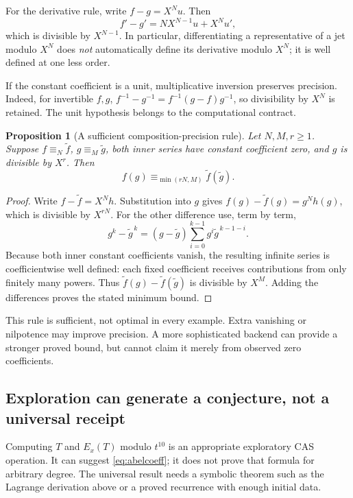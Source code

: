 \documentclass[11pt,letterpaper]{article}
\newtheorem{proposition}{Proposition}[section]
\theoremstyle{definition}
\begin{document}
For the derivative rule, write \(f-g=X^Nu\). Then
\[
 f'-g'=NX^{N-1}u+X^Nu',
\]
which is divisible by \(X^{N-1}\). In particular, differentiating a representative
of a jet modulo \(X^N\) does \emph{not} automatically define its derivative modulo
\(X^N\); it is well defined at one less order.

If the constant coefficient is a unit, multiplicative inversion preserves
precision. Indeed, for invertible \(f,g\),
\(f^{-1}-g^{-1}=f^{-1}(g-f)g^{-1}\), so divisibility by \(X^N\) is retained.
The unit hypothesis belongs to the computational contract.

\begin{proposition}[A sufficient composition-precision rule]
Let \(N,M,r\ge1\). Suppose \(f\equiv_N\widetilde f\),
\(g\equiv_M\widetilde g\), both inner series have constant coefficient zero,
and \(g\) is divisible by \(X^r\). Then
\[
 f(g)\equiv_{\min(rN,M)}\widetilde f(\widetilde g).
\]
\end{proposition}
\begin{proof}
Write \(f-\widetilde f=X^Nh\). Substitution into \(g\) gives
\(f(g)-\widetilde f(g)=g^Nh(g)\), which is divisible by \(X^{rN}\).
For the other difference use, term by term,
\[
 g^k-\widetilde g^{\,k}
 =(g-\widetilde g)\sum_{i=0}^{k-1}g^i\widetilde g^{\,k-1-i}.
\]
Because both inner constant coefficients vanish, the resulting infinite series
is coefficientwise well defined: each fixed coefficient receives contributions
from only finitely many powers. Thus
\(\widetilde f(g)-\widetilde f(\widetilde g)\) is divisible by \(X^M\).
Adding the differences proves the stated minimum bound.
\end{proof}

This rule is sufficient, not optimal in every example. Extra vanishing or nilpotence
may improve precision. A more sophisticated backend can provide a stronger proved
bound, but cannot claim it merely from observed zero coefficients.

\subsection{Exploration can generate a conjecture, not a universal receipt}
Computing \(T\) and \(E_x(T)\) modulo \(t^{10}\) is an appropriate exploratory CAS
operation. It can suggest \eqref{eq:abelcoeff}; it does not prove that formula for
arbitrary degree. The universal result needs a symbolic theorem such as the
Lagrange derivation above or a proved recurrence with enough initial data.
\end{document}
